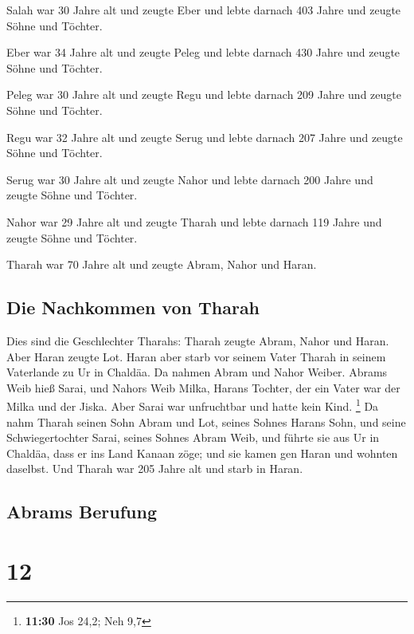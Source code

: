  Salah war 30 Jahre alt und zeugte Eber 
und lebte darnach 403 Jahre und zeugte Söhne und Töchter.

 Eber war 34 Jahre alt und zeugte Peleg 
und lebte darnach 430 Jahre und zeugte Söhne und Töchter.

 Peleg war 30 Jahre alt und zeugte Regu 
und lebte darnach 209 Jahre und zeugte Söhne und Töchter.

 Regu war 32 Jahre alt und zeugte Serug 
und lebte darnach 207 Jahre und zeugte Söhne und Töchter.

 Serug war 30 Jahre alt und zeugte Nahor 
und lebte darnach 200 Jahre und zeugte Söhne und Töchter.

 Nahor war 29 Jahre alt und zeugte Tharah 
und lebte darnach 119 Jahre und zeugte Söhne und Töchter.

 Tharah war 70 Jahre alt und zeugte Abram, Nahor und
Haran.

\hypertarget{die-nachkommen-von-tharah}{%
\subsection{Die Nachkommen von Tharah}\label{die-nachkommen-von-tharah}}

 Dies sind die Geschlechter Tharahs: Tharah zeugte Abram,
Nahor und Haran. Aber Haran zeugte Lot.  Haran aber starb
vor seinem Vater Tharah in seinem Vaterlande zu Ur in Chaldäa.
 Da nahmen Abram und Nahor Weiber. Abrams Weib hieß
Sarai, und Nahors Weib Milka, Harans Tochter, der ein Vater war der
Milka und der Jiska.  Aber Sarai war unfruchtbar und
hatte kein Kind. \footnote{\textbf{11:30} Jos 24,2; Neh 9,7}
 Da nahm Tharah seinen Sohn Abram und Lot, seines Sohnes
Harans Sohn, und seine Schwiegertochter Sarai, seines Sohnes Abram Weib,
und führte sie aus Ur in Chaldäa, dass er ins Land Kanaan zöge; und sie
kamen gen Haran und wohnten daselbst.  Und Tharah war 205
Jahre alt und starb in Haran.

\hypertarget{abrams-berufung}{%
\subsection{Abrams Berufung}\label{abrams-berufung}}

\hypertarget{section-11}{%
\section{12}\label{section-11}}

